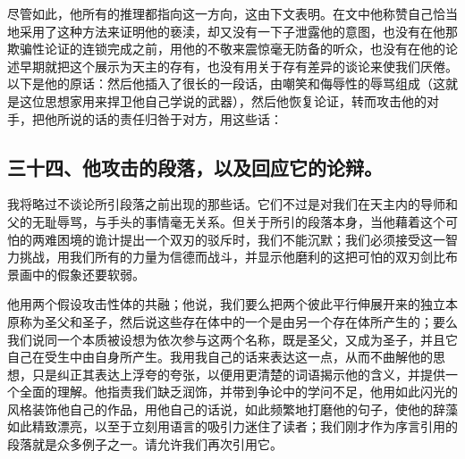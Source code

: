 尽管如此，他所有的推理都指向这一方向，这由下文表明。在文中他称赞自己恰当地采用了这种方法来证明他的亵渎，却又没有一下子泄露他的意图，也没有在他那欺骗性论证的连锁完成之前，用他的不敬来震惊毫无防备的听众，也没有在他的论述早期就把这个展示为天主的存有，也没有用关于存有差异的谈论来使我们厌倦。以下是他的原话：然后他插入了很长的一段话，由嘲笑和侮辱性的辱骂组成（这就是这位思想家用来捍卫他自己学说的武器），然后他恢复论证，转而攻击他的对手，把他所说的话的责任归咎于对方，用这些话：\par


\subsection{三十四、他攻击的段落，以及回应它的论辩。}

我将略过不谈论所引段落之前出现的那些话。它们不过是对我们在天主内的导师和父的无耻辱骂，与手头的事情毫无关系。但关于所引的段落本身，当他藉着这个可怕的两难困境的诡计提出一个双刃的驳斥时，我们不能沉默；我们必须接受这一智力挑战，用我们所有的力量为信德而战斗，并显示他磨利的这把可怕的双刃剑比布景画中的假象还要软弱。\par

他用两个假设攻击性体的共融；他说，我们要么把两个彼此平行伸展开来的独立本原称为圣父和圣子，然后说这些存在体中的一个是由另一个存在体所产生的；要么我们说同一个本质被设想为依次参与这两个名称，既是圣父，又成为圣子，并且它自己在受生中由自身所产生。我用我自己的话来表达这一点，从而不曲解他的思想，只是纠正其表达上浮夸的夸张，以便用更清楚的词语揭示他的含义，并提供一个全面的理解。他指责我们缺乏润饰，并带到争论中的学问不足，他用如此闪光的风格装饰他自己的作品，用他自己的话说，如此频繁地打磨他的句子，使他的辞藻如此精致漂亮，以至于立刻用语言的吸引力迷住了读者；我们刚才作为序言引用的段落就是众多例子之一。请允许我们再次引用它。\par

